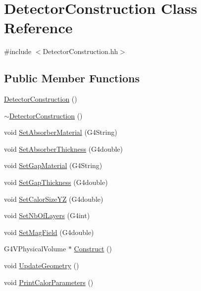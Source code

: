 \hypertarget{class_detector_construction}{\section{Detector\-Construction Class Reference}
\label{class_detector_construction}
}


{\ttfamily \#include $<$Detector\-Construction.\-hh$>$}

\subsection*{Public Member Functions}
\begin{DoxyCompactItemize}
\item 
\hyperlink{class_detector_construction_a1533c4308baddd0b2dcdf40f61dea1ef}{Detector\-Construction} ()
\item 
\hyperlink{class_detector_construction_a73013cab35a2b470338da2e4686edea3}{$\sim$\-Detector\-Construction} ()
\item 
void \hyperlink{class_detector_construction_a9b970ad4aacc014e624cc19ff5664d55}{Set\-Absorber\-Material} (G4\-String)
\item 
void \hyperlink{class_detector_construction_a966fd78fdccca049843b5763246d594b}{Set\-Absorber\-Thickness} (G4double)
\item 
void \hyperlink{class_detector_construction_ae511a5f00b0f6b52b258426d981440cd}{Set\-Gap\-Material} (G4\-String)
\item 
void \hyperlink{class_detector_construction_aa4fe52c7824b4272c9d6fdc54b906a4a}{Set\-Gap\-Thickness} (G4double)
\item 
void \hyperlink{class_detector_construction_a4e839c8ca5bdf75483333d32fe7912f4}{Set\-Calor\-Size\-Y\-Z} (G4double)
\item 
void \hyperlink{class_detector_construction_a9c0e7bcf321ffb2c6c3b6e51aa79a9f7}{Set\-Nb\-Of\-Layers} (G4int)
\item 
void \hyperlink{class_detector_construction_a63ab08aef61c63c09b59019e4d586d60}{Set\-Mag\-Field} (G4double)
\item 
G4\-V\-Physical\-Volume $\ast$ \hyperlink{class_detector_construction_a662c618480b345a747f014b845d5ffdf}{Construct} ()
\item 
void \hyperlink{class_detector_construction_a2742ef0ae83433992902a56693f2c6e5}{Update\-Geometry} ()
\item 
void \hyperlink{class_detector_construction_a47a2dfb018c7250eb1257bed265cab05}{Print\-Calor\-Parameters} ()

\end{DoxyCompactItemize}
